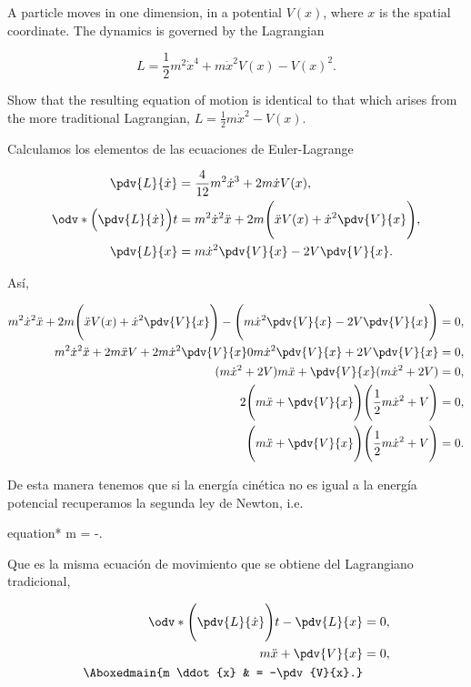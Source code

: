 \documentclass[../main.tex]{subfiles}
\begin{document}
\begin{problema}
	A particle moves in one dimension, in a potential \(V(x)\), where \(x\)
	is the spatial coordinate. The dynamics is governed by the Lagrangian

	\begin{equation*}
		L = \dfrac{1}{2}m^{2}\dot{x}^{4} + m \dot{x}^{2}V(x) - V(x)^{2}.
	\end{equation*}

	Show that the resulting equation of motion is identical to that which
	arises from the more traditional Lagrangian, \(L = \tfrac{1}{2}m \dot{x}^{2} - V(x)\).

	\startsolution

	Calculamos los elementos de las ecuaciones de Euler-Lagrange

	\begin{align*}
		\pdv{L}{\dot{x}}                       & = \dfrac{4}{12}m^{2}\dot{x}^{3} + 2m \dot{x}V(x),                                   \\
		\odv*{\Bigl(\pdv{L}{\dot{x}}\Bigr)}{t} & = m^{2}\dot{x}^{2}\ddot{x} + 2m \Biggl(\ddot{x}V(x) + \dot{x}^{2}\pdv{V}{x}\Biggr), \\
		\pdv{L}{x}                             & = m \dot{x}^{2}\pdv{V}{x} - 2V \pdv{V}{x}.
	\end{align*}

	Así,

	\begin{align*}
		m^{2} \dot{x}^{2}\ddot{x} + 2m \Biggl(\ddot{x}V(x) + \dot{x}^{2}\pdv{V}{x}\Biggr) -
		\Biggl(m \dot{x}^{2}\pdv{V}{x} - 2V \pdv{V}{x}\Biggr)                             & = 0, \\
		m^{2}\dot{x}^{2}\ddot{x} + 2m \ddot{x}V + 2m \dot{x}^{2}\pdv{V}{x} 0 m \dot{x}^{2}\pdv{V}{x}
		+ 2V \pdv{V}{x}                                                                   & = 0, \\
		(m \dot{x}^{2} + 2V)m \ddot{x} + \pdv{V}{x}(m \dot{x}^{2} + 2V)                   & = 0, \\
		2\Biggl(m \ddot{x} + \pdv{V}{x}\Biggr)\Biggl(\dfrac{1}{2}m \dot{x}^{2} + V\Biggr) & = 0, \\
		\Biggl(m \ddot{x} + \pdv{V}{x}\Biggr)\Biggl(\dfrac{1}{2}m \dot{x}^{2} + V\Biggr)  & = 0.
	\end{align*}

	De esta manera tenemos que si la energía cinética no es igual a la energía
	potencial recuperamos la segunda ley de Newton, i.e.

	\begin{empheq}[box = \mainresult]{equation*}
		m  = -.
	\end{empheq}

	Que es la misma ecuación de movimiento que se obtiene del Lagrangiano
	tradicional,

	\begin{align*}
		\odv*{\Biggl(\pdv{L}{\dot{x}}\Biggr)}{t} - \pdv{L}{x} & = 0,            \\
		m \ddot{x} + \pdv{V}{x}                               & = 0,            \\
		\Aboxedmain{m \ddot{x}                                & = -\pdv{V}{x}.}
	\end{align*}
\end{problema}
\end{document}
